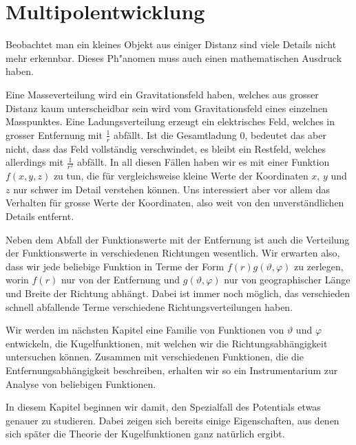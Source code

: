 %
%
%
\chapter{Multipolentwicklung
\label{skript:chapter:multipol}}
\rhead{}
Beobachtet man ein kleines Objekt aus einiger Distanz sind viele
Details nicht mehr erkennbar.
Dieses Ph"anomen muss auch einen mathematischen Ausdruck haben.

Eine Masseverteilung wird ein Gravitationsfeld haben, welches aus
grosser Distanz kaum unterscheidbar sein wird vom Gravitationsfeld
eines einzelnen Masspunktes.
Eine Ladungsverteilung erzeugt ein elektrisches Feld, welches in
grosser Entfernung mit $\frac1r$ abfällt.
Ist die Gesamtladung $0$, bedeutet das aber nicht, dass das
Feld vollständig verschwindet, es bleibt ein Restfeld, welches
allerdings mit $\frac1{r^2}$ abfällt.
In all diesen Fällen haben wir es mit einer Funktion $f(x,y,z)$ zu tun,
die für vergleichsweise kleine Werte der Koordinaten $x$, $y$ und $z$
nur schwer im Detail verstehen können.
Uns interessiert aber vor allem das Verhalten für grosse Werte der
Koordinaten, also weit von den unverständlichen Details entfernt.

Neben dem Abfall der Funktionswerte mit der Entfernung ist auch
die Verteilung der Funktionswerte in verschiedenen Richtungen wesentlich.
Wir erwarten also, dass wir jede beliebige Funktion in Terme der Form
$
f(r) g(\vartheta,\varphi)
$
zu zerlegen, worin $f(r)$ nur von der Entfernung und $g(\vartheta,\varphi)$
nur von geographischer Länge und Breite der Richtung abhängt.
Dabei ist immer noch möglich, das verschieden schnell abfallende
Terme verschiedene Richtungsverteilungen haben.

Wir werden im nächsten Kapitel eine Familie von Funktionen
von $\vartheta$ und $\varphi$ entwickeln, die Kugelfunktionen,
mit welchen wir die Richtungsabhängigkeit untersuchen können.
Zusammen mit verschiedenen Funktionen, die die Entfernungsabhängigkeit
beschreiben, erhalten wir so ein Instrumentarium zur Analyse von
beliebigen Funktionen.

In diesem Kapitel beginnen wir damit, den Spezialfall des Potentials
etwas genauer zu studieren.
Dabei zeigen sich bereits einige Eigenschaften, aus denen sich
später die Theorie der Kugelfunktionen ganz natürlich ergibt.








